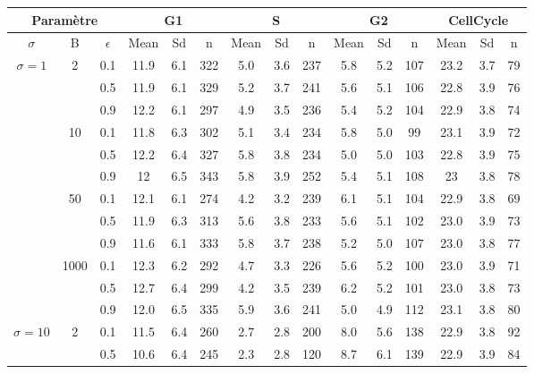 \documentclass{article}
\begin{document}
\begin{table}[!ht]
\begin{tabular}{|c|c|c|c|c|c|c|c|c|c|c|c|c|c|c|}
  \hline
    \multicolumn{3}{|c|}{Paramètre} & \multicolumn{3}{|c|}{G1} & \multicolumn{3}{|c|}{S} & \multicolumn{3}{|c|}{G2} & \multicolumn{3}{|c|}{CellCycle} \\
    \hline 
    $\sigma$ &  B & $\epsilon$  & Mean & Sd  & n & Mean & Sd & n & Mean & Sd & n & Mean & Sd & n  \\
  \hline
   \color{Red} $\sigma = 1$ & 2 & 0.1 & 11.9 & 6.1 & 322 & 5.0 & 3.6 & 237 & 5.8 & 5.2 & 107 & 23.2 &3.7 & 79\\
                &   & 0.5 & 11.9 & 6.1 & 329 & 5.2 & 3.7 & 241 & 5.6 & 5.1 & 106 &22.8 &3.9 &76\\
                &   & 0.9 & 12.2 & 6.1 & 297 & 4.9 & 3.5 & 236 & 5.4 & 5.2 & 104 &22.9 &3.8 &74\\
                & \color{Red} 10 & 0.1 & 11.8  & 6.3 & 302 & 5.1 & 3.4 & 234 & 5.8 & 5.0 & 99 & 23.1& 3.9 & 72\\
                &   & 0.5 & 12.2 & 6.4 & 327 & 5.8 & 3.8 & 234 & 5.0 & 5.0 & 103 & 22.8 &3.9 &75\\
                &   & \color{Red} 0.9 & \color{Red}12 & \color{Red}6.5 & \color{Red}343 &\color{Red} 5.8 &\color{Red} 3.9 &\color{Red} 252 &\color{Red} 5.4 &\color{Red} 5.1 &\color{Red} 108 &\color{Red} 23 &\color{Red} 3.8 &\color{Red} 78\\
                & 50 & 0.1 & 12.1 & 6.1 & 274 & 4.2 & 3.2 & 239 & 6.1 & 5.1 & 104 &22.9 &3.8 &69\\
                &   & 0.5 & 11.9 & 6.3 & 313 & 5.6 & 3.8 & 233 & 5.6 & 5.1 & 102 &23.0 &3.9 &73\\
                &   & 0.9 & 11.6 & 6.1 & 333 & 5.8 & 3.7 & 238 & 5.2 & 5.0 & 107 &23.0 &3.8 &77\\
                & 1000 & 0.1 & 12.3 & 6.2 & 292 & 4.7 & 3.3 & 226 & 5.6 & 5.2 & 100 &23.0 &3.9 &71\\
                &   & 0.5 & 12.7 & 6.4 & 299 & 4.2 & 3.5 & 239 & 6.2 & 5.2 & 101 &23.0 &3.8 &73\\
                &   & 0.9 & 12.0 & 6.5 & 335 & 5.9 & 3.6 & 241 & 5.0 & 4.9 & 112 &23.1 &3.8 &80\\
\hline
  $\sigma = 10$ & 2 & 0.1 &  11.5 & 6.4 & 260 & 2.7& 2.8& 200 & 8.0 & 5.6 & 138 & 22.9 &3.8 & 92\\
                &   & 0.5 & 10.6 & 6.4 & 245 & 2.3 & 2.8 & 120 & 8.7 & 6.1 & 139 &22.9 & 3.9&84\\

\end{tabular}
\end{table}
\end{document}
